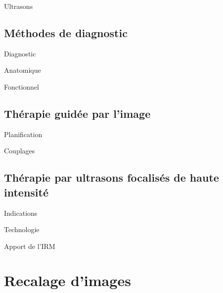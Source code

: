 \documentclass{beamer}
\begin{document}
\begin{frame}{Ultrasons}
 
\end{frame}

\subsection{Méthodes de diagnostic}
\begin{frame}{Diagnostic}
 
\end{frame}

\begin{frame}{Anatomique}
 
\end{frame}

\begin{frame}{Fonctionnel}
 
\end{frame}

\subsection{Thérapie guidée par l'image}
\begin{frame}{Planification}
 
\end{frame}

\begin{frame}{Couplages}
 
\end{frame}

\subsection{Thérapie par ultrasons focalisés de haute intensité}
\begin{frame}{Indications}
 
\end{frame}

\begin{frame}{Technologie}
 
\end{frame}

\begin{frame}{Apport de l'IRM}
 
\end{frame}


\section{Recalage d'images}
\end{document}
